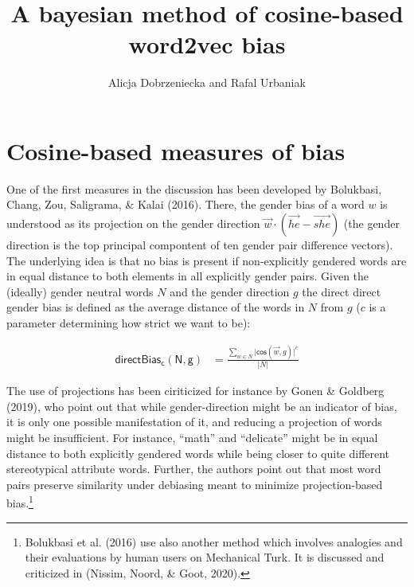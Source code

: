 \documentclass[10pt,dvipsnames,enabledeprecatedfontcommands]{scrartcl}
\title{A bayesian method of cosine-based word2vec bias}
\author{Alicja Dobrzeniecka and Rafal Urbaniak}
\date{}
\begin{document}
\maketitle

\tableofcontents

\section{Cosine-based measures of
bias}\label{cosine-based-measures-of-bias}


One of the first measures in the discussion has been developed by
Bolukbasi, Chang, Zou, Saligrama, \& Kalai (2016). There, the gender
bias of a word \(w\) is understood as its projection on the gender
direction \(\vec{w} \cdot (\overrightarrow{he} - \overrightarrow{she})\)
(the gender direction is the top principal compontent of ten gender pair
difference vectors). The underlying idea is that no bias is present if
non-explicitly gendered words are in equal distance to both elements in
all explicitly gender pairs. Given the (ideally) gender neutral words
\(N\) and the gender direction \(g\) the direct direct gender bias is
defined as the average distance of the words in \(N\) from \(g\) (\(c\)
is a parameter determining how strict we want to be):

\begin{align}
\mathsf{directBias_c(N,g)} & = \frac{\sum_{w\in N}\vert \mathsf{cos}(\vec{w},g)\vert^c}{\vert N \vert }
\end{align}

The use of projections has been ciriticized for instance by Gonen \&
Goldberg (2019), who point out that while gender-direction might be an
indicator of bias, it is only one possible manifestation of it, and
reducing a projection of words might be insufficient. For instance,
``math'' and ``delicate'' might be in equal distance to both explicitly
gendered words while being closer to quite different stereotypical
attribute words. Further, the authors point out that most word pairs
preserve similarity under debiasing meant to minimize projection-based
bias.\footnote{Bolukbasi et al. (2016) use also another method which
  involves analogies and their evaluations by human users on Mechanical
  Turk. It is discussed and criticized in (Nissim, Noord, \& Goot,
  2020).}
\end{document}
